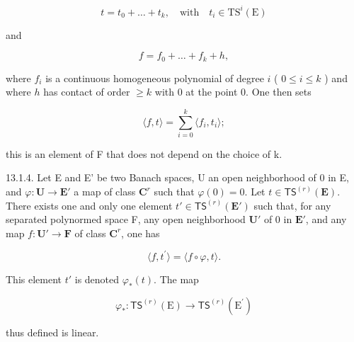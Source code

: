 \[
t=t_{0}+\dots+t_{k},\quad\text{with}\quad t_{i}\in\mathrm{TS}^{i}(\mathrm{E})
\]

and

\[
f = f _ {0} + \dots + f _ {k} + h,
\]

where \(f_i\) is a continuous homogeneous polynomial of degree \(i\) ( \(0 \leqslant i \leqslant k\) ) and where \(h\) has contact of order \(\geqslant k\) with 0 at the point 0. One then sets

\[
\langle f, t \rangle = \sum_ {i = 0} ^ {k} \langle f _ {i}, t _ {i} \rangle ;
\]

this is an element of F that does not depend on the choice of k.

13.1.4. Let E and E' be two Banach spaces, U an open neighborhood of 0 in E, and \(\varphi\colon\mathbf{U}\to\mathbf{E}'\) a map of class \(\mathbf{C}^{r}\) such that \(\varphi(0)=0\). Let \(t\in\mathsf{TS}^{(r)}(\mathbf{E})\). There exists one and only one element \(t'\in\mathsf{TS}^{(r)}(\mathbf{E}')\) such that, for any separated polynormed space F, any open neighborhood \(\mathbf{U}'\) of 0 in \(\mathbf{E}'\), and any map \(f\colon\mathbf{U}'\to\mathbf{F}\) of class \(\mathbf{C}^{r}\), one has

\[
\langle f, t ^ {\prime} \rangle = \langle f \circ \varphi , t \rangle .\tag{*}
\]

This element \(t'\) is denoted \(\varphi_{*}(t)\). The map

\[
\varphi_ {*} \colon \mathsf {T S} ^ {(r)} (\mathrm{E}) \to \mathsf {T S} ^ {(r)} (\mathrm{E} ^ {\prime})
\]

thus defined is linear.
